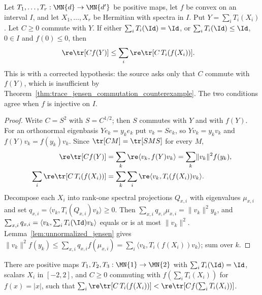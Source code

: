 \begin{theorem}%
    \label{thm:trace_jensen_positive_maps}
    \leanok
    Let $T_1,\ldots,T_r:\MN{d}\to\MN{d'}$ be positive maps, let $f$ be convex
    on an interval $I$, and let $X_1,\ldots,X_r$ be Hermitian with spectra in
    $I$. Put $Y=\sum_iT_i(X_i)$. Let $C\ge0$ commute with $Y$. If either
    $\sum_iT_i(\Id)=\Id$, or $\sum_iT_i(\Id)\le\Id$, $0\in I$ and
    $f(0)\le0$, then
    \begin{align}
        \re\tr[Cf(Y)]&\le\sum_i\re\tr[C\,T_i(f(X_i))].
        \notag
    \end{align}
    This is \cite[Theorem~5.17, Equation~(5.51)]{Wolf2012Quantum} with a
    corrected hypothesis: the source asks only that $C$ commute with $f(Y)$,
    which is insufficient by Theorem~\ref{thm:trace_jensen_commutation_counterexample}.
    The two conditions agree when $f$ is injective on $I$.
\end{theorem}

\begin{proof}\leanok
    Write $C=S^2$ with $S=C^{1/2}$; then $S$ commutes with $Y$ and with
    $f(Y)$. For an orthonormal eigenbasis $Ye_k=y_ke_k$ put $v_k=Se_k$, so
    $Yv_k=y_kv_k$ and $f(Y)v_k=f(y_k)v_k$. Since $\tr[CM]=\tr[SMS]$ for
    every $M$,
    \begin{align}
        \re\tr[Cf(Y)]&=\sum_k\re\langle v_k,f(Y)v_k\rangle
            =\sum_k\lVert v_k\rVert^2f(y_k),
        \notag\\
        \sum_i\re\tr[C\,T_i(f(X_i))]
            &=\sum_k\sum_i\re\langle v_k,T_i(f(X_i))v_k\rangle.
        \notag
    \end{align}
    Decompose each $X_i$ into rank-one spectral
    projections $Q_{x,i}$ with eigenvalues $\mu_{x,i}$ and set
    $q_{x,i}=\langle v_k,T_i(Q_{x,i})v_k\rangle\ge0$. Then
    $\sum_{x,i}q_{x,i}\mu_{x,i}=\lVert v_k\rVert^2y_k$, and
    $\sum_{x,i}q_{x,i}=\langle v_k,\sum_iT_i(\Id)v_k\rangle$ equals or is at
    most $\lVert v_k\rVert^2$. Lemma~\ref{lem:unnormalized_jensen} gives
    $\lVert v_k\rVert^2f(y_k)\le\sum_{x,i}q_{x,i}f(\mu_{x,i})
    =\sum_i\langle v_k,T_i(f(X_i))v_k\rangle$; sum over $k$.
\end{proof}

\begin{theorem}%
    \label{thm:trace_jensen_commutation_counterexample}
    \leanok
    There are positive maps $T_1,T_2,T_3:\MN{1}\to\MN{2}$ with
    $\sum_iT_i(\Id)=\Id$, scalars $X_i$ in $[-2,2]$, and $C\ge0$ commuting
    with $f(\sum_iT_i(X_i))$ for $f(x)=|x|$, such that
    $\sum_i\re\tr[C\,T_i(f(X_i))]<\re\tr[Cf(\sum_iT_i(X_i))]$.
\end{theorem}

